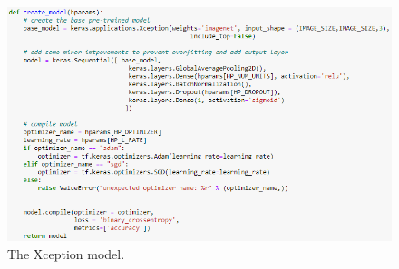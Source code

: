 \begin{figure}[H]
    \centering
    \includegraphics[width=\textwidth]{figures/xception-model.png}
    \caption{The Xception model.}
    \label{fig:xception-model}
\end{figure}

